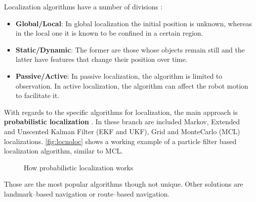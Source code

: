  Localization algorithms have a number of divisions :
\begin{itemize}
  \item \textbf{Global/Local}: In global localization the initial position is unknown, whereas in the local one it is known to be confined in a certain region.

  \item \textbf{Static/Dynamic}: The former are those whose objects remain still and the latter have features that change their position over time.

  \item \textbf{Passive/Active}: In passive localization, the algorithm is limited to observation. In active localization, the algorithm can affect the robot motion to facilitate it.
\end{itemize}  

 With regards to the specific algorithms for localization, the main approach is \textbf{probabilistic localization} . In these branch are included Markov, Extended and Unscented Kalman Filter (EKF and UKF), Grid and MonteCarlo (MCL) localizations. \autoref{fig:locnoloc} shows a working example of a particle filter based localization algorithm, similar to MCL.

\begin{figure}[htb]
  \centering
   \quad
  \caption{How probabilistic localization works}
  \label{fig:locnoloc}
\end{figure} 

Those are the most popular algorithms though not unique. Other solutions are landmark--based navigation or route--based navigation. 

